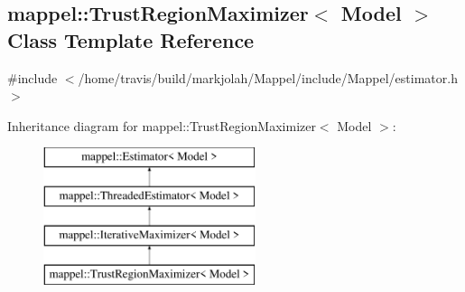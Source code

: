 \hypertarget{classmappel_1_1TrustRegionMaximizer}{}\subsection{mappel\+:\+:Trust\+Region\+Maximizer$<$ Model $>$ Class Template Reference}
\label{classmappel_1_1TrustRegionMaximizer}


{\ttfamily \#include $<$/home/travis/build/markjolah/\+Mappel/include/\+Mappel/estimator.\+h$>$}

Inheritance diagram for mappel\+:\+:Trust\+Region\+Maximizer$<$ Model $>$\+:\begin{figure}[H]
\begin{center}
\leavevmode
\includegraphics[height=4.000000cm]{classmappel_1_1TrustRegionMaximizer}
\end{center}
\end{figure}
